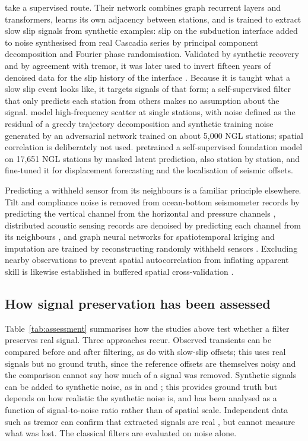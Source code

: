 \documentclass[11pt,a4paper]{article}
\begin{document}
\citet{costantino2024} take a supervised route. Their network combines graph recurrent layers and transformers, learns its own adjacency between stations, and is trained to extract slow slip signals from synthetic examples: slip on the subduction interface added to noise synthesised from real Cascadia series by principal component decomposition and Fourier phase randomisation. Validated by synthetic recovery and by agreement with tremor, it was later used to invert fifteen years of denoised data for the slip history of the interface \citep{costantino2026}. Because it is taught what a slow slip event looks like, it targets signals of that form; a self-supervised filter that only predicts each station from others makes no assumption about the signal. \citet{mastella2025} model high-frequency scatter at single stations, with noise defined as the residual of a greedy trajectory decomposition \citep{bedfordbevis2018} and synthetic training noise generated by an adversarial network trained on about 5,000 NGL stations; spatial correlation is deliberately not used. \citet{teutschmann2026} pretrained a self-supervised foundation model on 17,651 NGL stations by masked latent prediction, also station by station, and fine-tuned it for displacement forecasting and the localisation of seismic offsets.

Predicting a withheld sensor from its neighbours is a familiar principle elsewhere. Tilt and compliance noise is removed from ocean-bottom seismometer records by predicting the vertical channel from the horizontal and pressure channels \citep{crawfordwebb2000,janiszewski2019}, distributed acoustic sensing records are denoised by predicting each channel from its neighbours \citep{batson2019,vandenende2023}, and graph neural networks for spatiotemporal kriging and imputation are trained by reconstructing randomly withheld sensors \citep{wu2021ignnk,cini2022grin,marisca2022spin}. Excluding nearby observations to prevent spatial autocorrelation from inflating apparent skill is likewise established in buffered spatial cross-validation \citep{lerest2014}.

\subsection{How signal preservation has been assessed}

Table~\ref{tab:assessment} summarises how the studies above test whether a filter preserves real signal. Three approaches recur. Observed transients can be compared before and after filtering, as \citet{bachelot2025} do with slow-slip offsets; this uses real signals but no ground truth, since the reference offsets are themselves noisy and the comparison cannot say how much of a signal was removed. Synthetic signals can be added to synthetic noise, as in \citet{costantino2024} and \citet{mastella2025}; this provides ground truth but depends on how realistic the synthetic noise is, and has been analysed as a function of signal-to-noise ratio rather than of spatial scale. Independent data such as tremor can confirm that extracted signals are real \citep{costantino2024}, but cannot measure what was lost. The classical filters are evaluated on noise alone.
\end{document}
